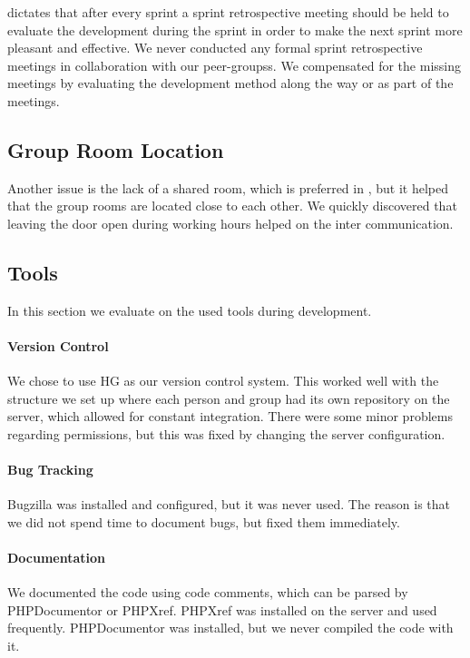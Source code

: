 \scrum{} dictates that after every sprint a sprint retrospective meeting should be held to evaluate the development during the sprint in order to make the next sprint more pleasant and effective.
We never conducted any formal sprint retrospective meetings in collaboration with our peer-groupss.
We compensated for the missing meetings by evaluating the development method along the way or as part of the \sos{} meetings. 





\subsection{Group Room Location}
Another issue is the lack of a shared room, which is preferred in \sos{}, but it helped that the group rooms are located close to each other. 
We quickly discovered that leaving the door open during working hours helped on the inter \subgroup{} communication. 



\subsection{Tools}
In this section we evaluate on the used tools during development. 

\paragraph{Version Control}
We chose to use HG as our version control system. 
This worked well with the structure we set up where each person and group had its own repository on the server, which allowed for constant integration. 
There were some minor problems regarding permissions, but this was fixed by changing the server configuration. 


\paragraph{Bug Tracking}
Bugzilla was installed and configured, but it was never used. 
The reason is that we did not spend time to document bugs, but fixed them immediately. 

\paragraph{Documentation}
We documented the code using code comments, which can be parsed by PHPDocumentor or PHPXref. 
PHPXref was installed on the server and used frequently. 
PHPDocumentor was installed, but we never compiled the code with it. 

